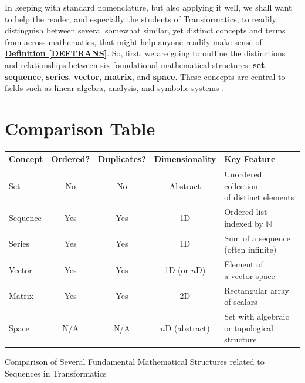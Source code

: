 \documentclass[a4paper, 18pt]{book} %
\begin{document}
\begin{appendices}
\vspace{2em}

In keeping with standard nomenclature, but also applying it well, we shall want to help the reader, and especially the students of Transformatics, to readily distinguish between several somewhat similar, yet distinct concepts and terms from across mathematics, that might help anyone readily make sense of \textbf{\hyperref[DEFTRANS]{Definition \ref{DEFTRANS}}}. So, first, we are going to outline the distinctions and relationships between six foundational mathematical structures: \textbf{set}, \textbf{sequence}, \textbf{series}, \textbf{vector}, \textbf{matrix}, and \textbf{space}. These concepts are central to fields such as linear algebra, analysis, and symbolic systems \cite{axler2015linear, rudin1976principles}.


\section*{Comparison Table}

\begin{center}
\begin{tabular}{|l|c|c|c|l|}
\hline
\textbf{Concept} & \textbf{Ordered?} & \textbf{Duplicates?} & \textbf{Dimensionality} & \textbf{Key Feature} \\
\hline
\hline
Set & No & No & Abstract & \makecell[l]{Unordered collection\\of distinct elements}\\
\hline
Sequence & Yes & Yes & 1D & \makecell[l]{Ordered list\\indexed by $\mathbb{N}$}\\
\hline
Series & Yes & Yes & 1D & \makecell[l]{Sum of a sequence\\(often infinite)}\\
\hline
Vector & Yes & Yes & 1D (or $n$D) & \makecell[l]{Element of\\a vector space}\\
\hline
Matrix & Yes & Yes & 2D & \makecell[l]{Rectangular array\\of scalars}\\
\hline
Space & N/A & N/A & $n$D (abstract) & \makecell[l]{Set with algebraic\\or topological structure}\\
\hline
\end{tabular}
\label{TABCOMPCONCEPTS}
\caption{Comparison of Several Fundamental Mathematical Structures related to Sequences in Transformatics}
\end{center}


\end{appendices}
\end{document}
